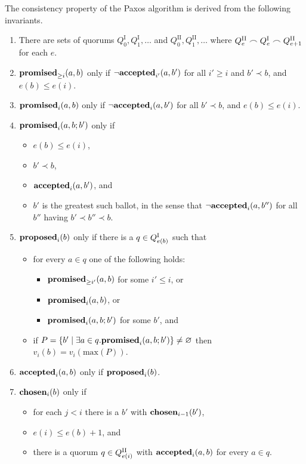 \documentclass[journal]{IEEEtran}
\begin{document}
The consistency property of the Paxos algorithm is derived from the following
invariants.

\begin{enumerate}

\item\label{paxos-quorums} There are sets of quorums $Q^\textrm{I}_0,
Q^\textrm{I}_1, \ldots$ and $Q^\textrm{II}_0, Q^\textrm{II}_1, \ldots$ where
${Q^\textrm{II}_e \frown Q^\textrm{I}_e \frown {Q}^\textrm{II}_{e+1}}$ for each $e$.

\item\label{paxos-mprom} $\mathbf{promised}_{\ge i}(a,b)$ only if $\neg\mathbf{accepted}_{i'}(a,b')$ for
all $i' \ge i$ and $b' \prec b$, and $e(b) \le e(i)$.

\item\label{paxos-fprom} $\mathbf{promised}_{i}(a,b)$ only if $\neg\mathbf{accepted}_{i}(a,b')$ for all
$b' \prec b$, and $e(b) \le e(i)$.

\item\label{paxos-bprom} $\mathbf{promised}_{i}(a,b;b')$ only if \begin{itemize} \item
$e(b) \le e(i)$, \item $b' \prec b$, \item $\mathbf{accepted}_{i}(a,b')$, and \item $b'$ is
the greatest such ballot, in the sense that $\neg \mathbf{accepted}_{i}(a,b'')$ for all
$b''$ having $b' \prec b'' \prec b$. \end{itemize}

\item\label{paxos-prop} $\mathbf{proposed}_{i}(b)$ only if there is a $q \in {Q}^\textrm{I}_{e(b)}$ such
that
\begin{itemize}
\item for every $a \in q$ one of the following holds:
%
\begin{itemize}
\item $\mathbf{promised}_{\ge i'}(a,b)$ for some $i' \le i$, or
\item $\mathbf{promised}_{i}(a,b)$, or
\item $\mathbf{promised}_{i}(a,b;b')$ for some $b'$, and
\end{itemize}

\item if $P = \{ b' \mid \exists a \in q. \mathbf{promised}_{i}(a,b;b') \} \ne
\varnothing$ then $v_i(b) = v_i(\mathrm{max}(P))$.

\end{itemize}

\item \label{paxos-acc} $\mathbf{accepted}_{i}(a,b)$ only if $\mathbf{proposed}_{i}(b)$.

\item \label{paxos-chosen} $\mathbf{chosen}_{i}(b)$ only if \begin{itemize} \item for
each $j < i$ there is a $b'$ with $\mathbf{chosen}_{i-1}(b')$, \item $e(i) \le e(b) +
1$, and \item there is a quorum $q \in {Q}^\textrm{II}_{e(i)}$ with $\mathbf{accepted}_{i}(a,b)$ for
every $a \in q$.  \end{itemize}

\end{enumerate}
\end{document}
